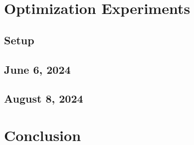 \section{Optimization Experiments}

\subsection{Setup}

\subsection{June 6, 2024}

\subsection{August 8, 2024}

\section{Conclusion}